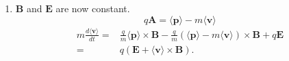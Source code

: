 \begin{enumerate}
        \begin{align*}
            m\frac{d}{dt}\langle v_x\rangle = & 
            \frac{i}{2m\hbar}
            \langle qi\hbar(-p_yB_z+p_zB_y)-q^2i\hbar(-A_yB_z+A_zB_y)\rangle\\
            &+\frac{i}{2m\hbar}
            \langle qi\hbar(-B_zp_y+B_yp_z)-q^2i\hbar(-B_zA_y+B_yA_z)\rangle
            +\frac{i}{\hbar}i\hbar \langle\frac{\partial \varphi}{\partial x}\rangle
            -q\langle \frac{\partial A_x}{\partial t}\rangle\\
            =&\frac{q}{2m}\langle (\bm p\times \bm B)_x\rangle
            -\frac{q}{2m}\langle (\bm B \times \bm p)_x\rangle
            -\frac{q^2}{m}
            \langle(\bm A\times \bm B)_x\rangle
            +q\langle \bm E_x\rangle
        \end{align*}
        Thus 
        \begin{align*}
            m\frac{d}{dt}\langle \bm v\rangle
            = \frac{q}{2m}\langle (\bm p\times \bm B - \bm B \times \bm p)\rangle
            -\frac{q^2}{m}
            \langle \bm A\times \bm B \rangle
            +q\langle \bm E\rangle.
            \end{align*}
            \item 
            $\bm B$ and $\bm E$ are now constant.
            $$
            q\bm A =\langle\bm p\rangle - m\langle\bm v\rangle 
            $$
            \begin{align*}
                m\frac{d\langle\bm v\rangle}{dt}
                =&
                \frac{q}{m}\langle\bm p\rangle\times \bm B
                -\frac{q}{m}(\langle\bm p\rangle-m\langle\bm v\rangle)\times \bm B + q\bm E\\
                =&q(\bm E + \langle\bm v\rangle\times \bm B).
            \end{align*}
         
       \end{enumerate}

